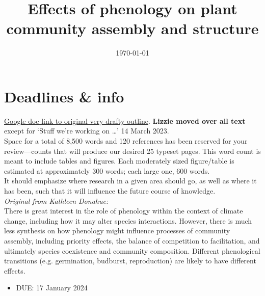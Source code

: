 \documentclass[11pt]{article}
\begin{document}


\title{Effects of phenology on plant community assembly and structure }
\author{}
\date{\today}
\maketitle
\tableofcontents

\section{Deadlines \& info}
\href{https://docs.google.com/document/d/1hSAbi-9lcc7Pek-CGSs_uZRHI6SD3DPK_fiHJ8Rkz7Y/edit?usp=sharing}{Google doc link to original very drafty outline}. {\bf Lizzie moved over all text} except for `Stuff we’re working on …' 14 March 2023. \\

Space for a total of 8,500 words and 120 references has been reserved for your review—counts that will produce our desired 25 typeset pages. This word count is meant to include tables and figures. Each moderately sized figure/table is estimated at approximately 300 words; each large one, 600 words.\\

It should emphasize where research in a given area should go, as well as where it has been, such that it will influence the future course of knowledge. \\

\emph{Original from Kathleen Donahue: }\\
There is great interest in the role of phenology within the context of climate change, including how it may alter species interactions. However, there is much less synthesis on how phenology might influence processes of community assembly, including priority effects, the balance of competition to facilitation, and ultimately species coexistence and community composition. Different phenological transitions (e.g. germination, budburst, reproduction) are likely to have different effects.


\begin{itemize}
\item DUE: 17 January 2024
\end{itemize}
\end{document}
